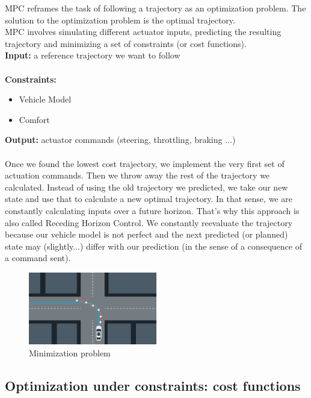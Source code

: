 \documentclass[11pt]{article}
\begin{document}
MPC reframes the task of following a trajectory as an optimization problem. The solution to the optimization problem is the optimal trajectory. \\

MPC involves simulating different actuator inputs, predicting the resulting trajectory and minimizing a set of constraints (or cost functions). \\ 

\textbf{Input:} a reference trajectory we want to follow \\ \\
\textbf{Constraints:}
\begin{itemize}
\item Vehicle Model
\item Comfort
\end{itemize}

\textbf{Output:} actuator commands (steering, throttling, braking ...)  \\ \\

Once we found the lowest cost trajectory, we implement the very first set of actuation commands. Then we throw away the rest of the trajectory we calculated. Instead of using the old trajectory we predicted, we take our new state and use that to calculate a new optimal trajectory. In that sense, we are constantly calculating inputs over a future horizon. That's why this approach is also called Receding Horizon Control. We constantly reevaluate the trajectory because our vehicle model is not perfect and the next predicted (or planned) state may (slightly...) differ with our prediction (in the sense of a consequence of a command sent). 


\begin{figure}[h]
    \centering
    \includegraphics[width=0.5\textwidth]{minimization}
    \caption{Minimization problem}
    \label{fig:minimization}
\end{figure} 

\subsection{Optimization under constraints: cost functions}
\end{document}
